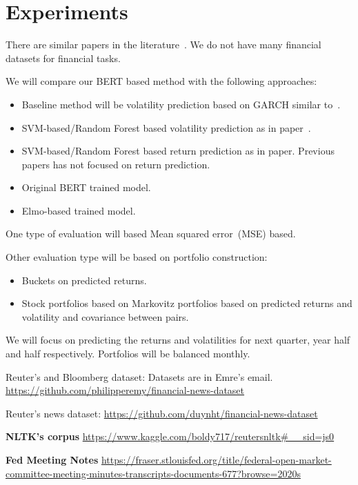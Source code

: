 \documentclass[11pt]{article}
\begin{document}
\section{Experiments}


There are similar papers in the literature~\cite{kogan2009}. We do not have many financial datasets for financial tasks.

We will compare our BERT based method with the following approaches:
\begin{itemize}
\item Baseline method will be volatility prediction based on GARCH similar to~\cite{kogan2009}.
\item SVM-based/Random Forest based volatility prediction as in
  paper~\cite{kogan2009}.
  \item SVM-based/Random Forest based return prediction as in
    paper. Previous papers has not focused on return prediction.
  \item Original BERT trained model.
   \item Elmo-based trained model.
\end{itemize}

One type of evaluation will based Mean squared error~(MSE) based.

Other evaluation type will be based on portfolio construction:
\begin{itemize}
\item Buckets on predicted returns. 
\item Stock portfolios based on Markovitz portfolios based on predicted returns and volatility and covariance between pairs.
\end{itemize}

We will focus on predicting the returns and volatilities for next
quarter, year half and half respectively. Portfolios will be balanced monthly.


Reuter's and Bloomberg dataset: Datasets are in Emre's email.
\url{https://github.com/philipperemy/financial-news-dataset}

Reuter's news dataset:
\url{https://github.com/duynht/financial-news-dataset}


\textbf{NLTK's corpus}
\url{https://www.kaggle.com/boldy717/reutersnltk#__sid=js0}


\textbf{Fed Meeting Notes}
\url{https://fraser.stlouisfed.org/title/federal-open-market-committee-meeting-minutes-transcripts-documents-677?browse=2020s}
\end{document}
